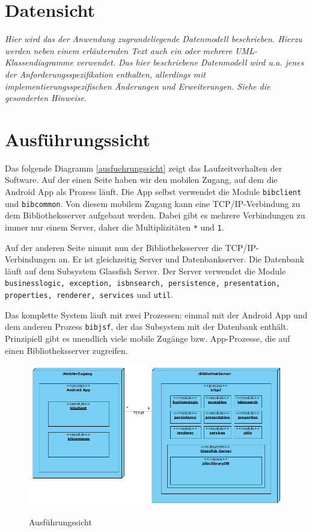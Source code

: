 \documentclass[fontsize=12pt,paper=a4,twoside]{scrartcl}
\begin{document}
\section{Datensicht}
\label{sec:datensicht}

{\it Hier wird das der Anwendung zugrundeliegende Datenmodell
  beschrieben. Hierzu werden neben einem erläuternden Text auch ein
  oder mehrere {UML}-Klassendiagramme verwendet. Das hier beschriebene
  Datenmodell wird u.a. jenes der Anforderungsspezifikation enthalten,
  allerdings mit implementierungsspezifischen Änderungen und
  Erweiterungen. Siehe die gesonderten Hinweise.}
  
  

\section{Ausführungssicht}

Das folgende Diagramm \vref{ausfuehrungssicht} zeigt das Laufzeitverhalten der Software.
Auf der einen Seite haben wir den mobilen Zugang, auf dem die Android App als Prozess läuft. Die App selbst verwendet die Module \texttt{bibclient} und \texttt{bibcommon}. Von diesem mobilem Zugang kann eine TCP/IP-Verbindung zu dem Bibliotheksserver aufgebaut werden. Dabei gibt es mehrere Verbindungen zu immer nur einem Server, daher die Multiplizitäten \texttt{*} und \texttt{1}.

Auf der anderen Seite nimmt nun der Bibliotheksserver die TCP/IP-Verbindungen an. Er ist gleichzeitig Server und Datenbankserver. Die Datenbank läuft auf dem Subsystem Glassfish Server. Der Server verwendet die Module \texttt{businesslogic, exception, isbnsearch, persistence, presentation, properties, renderer, services} und \texttt{util}.

Das komplette System läuft mit zwei Prozessen: einmal mit der Android App und dem anderen Prozess \texttt{bibjsf}, der das Subsystem mit der Datenbank enthält. Prinzipiell gibt es unendlich viele mobile Zugänge bzw. App-Prozesse, die auf einen Bibliotheksserver zugreifen.

\begin{figure} [H] 
\caption{Ausführungssicht} 
	\includegraphics[width=1\textwidth]{Diagramme/ausfuehrungssicht.png} 
	\label{ausfuehrungssicht} 
\end{figure}
\label{sec:ausfuehrung}
\end{document}
